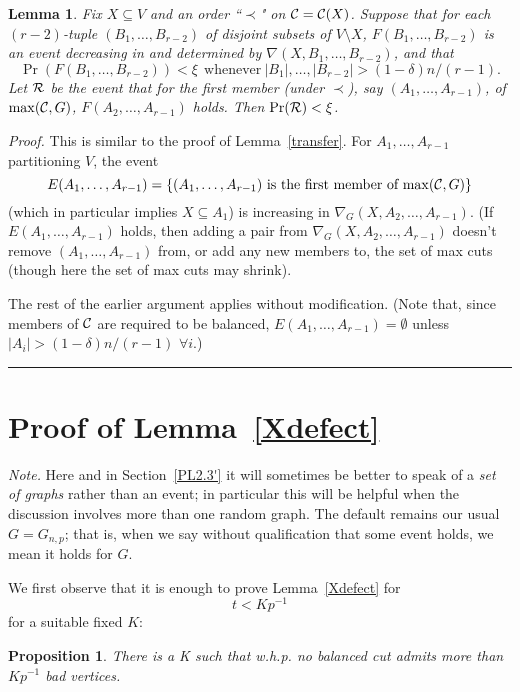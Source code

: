 \documentclass[letterpaper,11pt]{article}
\newtheorem{lemma}[thm]{Lemma}
\newtheorem{prop}[thm]{Proposition}
\newcommand{\beq}[1]{\begin{equation}\label{#1}}
\newcommand{\enq}[0]{\end{equation}}
\newcommand{\nin}[0]{\noindent}
\newcommand{\sub}[0]{\subseteq}
\newcommand{\sm}[0]{\setminus}
\renewcommand{\dots}[0]{,\ldots,}
\newcommand{\cee}[0]{{\cal C}}
\newcommand{\R}[0]{{\cal R}}
\newcommand{\0}[0]{\emptyset}
\renewcommand{\qed}[0]{\begin{flushright} \rule{2mm}{3mm} \end{flushright}}
\newcommand{\gd}[0]{\delta }
\begin{document}
\begin{lemma}\label{transfer2}
Fix $X\sub V$ and an order ``$\prec$" on $\cee=\cee(X)$.
Suppose that for each $(r-2)$-tuple $(B_1\dots B_{r-2})$ of
disjoint subsets of $V\sm X$,
$F(B_1\dots B_{r-2})$
is an event decreasing in and determined by
$\nabla(X,B_1\dots B_{r-2})$,
and that
\beq{FST'}
\Pr(F(B_1\dots B_{r-2}))< \xi ~~\mbox{whenever}
~|B_1|\dots |B_{r-2}| > (1-\gd)n/(r-1).
\enq
Let
$\R$ be the event that
for the first member (under $\prec$),
say $(A_1\dots A_{r-1})$, of $\max(\cee,G)$,
$F(A_2\dots A_{r-1})$ holds.
Then $\Pr(\R)< \xi$.
\end{lemma}

\nin
{\em Proof.}
This is similar to the proof of
Lemma~\ref{transfer}.
For $A_1\dots A_{r-1}$ partitioning $ V$,
the event
\[
E(A_1\dots A_{r-1})=
\{\mbox{$(A_1\dots A_{r-1})$
is the first member of $\max(\cee,G)$}\}
\]
(which in particular implies $X\sub A_1$)
is increasing in $\nabla_G(X,A_2\dots A_{r-1})$.
(If $E(A_1\dots A_{r-1})$ holds, then
adding a pair from
$\nabla_G(X,A_2\dots A_{r-1})$
doesn't remove $(A_1\dots A_{r-1})$ from,
or add any new members to, the
set of max cuts
(though here the set of max cuts may shrink).

The rest of the earlier argument applies without modification.
(Note that, since members of $\cee$ are required to be balanced,
$E(A_1\dots A_{r-1})=\0$ unless $|A_i|>(1-\gd)n/(r-1)$
$\forall i$.)\qed


\section{Proof of Lemma~\ref{Xdefect}}\label{PXdefect}


{\em Note.}  Here and in Section~\ref{PL2.3'}
it will sometimes be better to speak of a {\em set of graphs} rather than
an event; in particular this will be helpful when the discussion involves
more than one random graph.
The default remains our usual $G=G_{n,p}$; that is, when we say without
qualification that some event holds, we mean it holds for $G$.

\medskip
We first observe that it is enough to prove Lemma~\ref{Xdefect} for
\beq{t}
t<Kp^{-1}
\enq
for a suitable fixed $K$:




\begin{prop}\label{propt}
There is a K such that w.h.p. no balanced cut admits more
than $Kp^{-1}$ bad vertices.
\end{prop}
%
\end{document}
